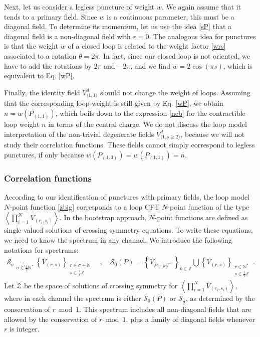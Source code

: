 \documentclass[12pt, a4paper]{article}
\begin{document}
Next, let us consider a legless puncture of weight $w$. We again assume that it tends to a primary field. Since $w$ is a continuous parameter, this must be a diagonal field. To determine its momentum, let us use the idea \eqref{sP} that a diagonal field is a non-diagonal field with $r=0$. The analogous idea for punctures is that the weight $w$ of a closed loop is related to the weight factor \eqref{wrs} associated to a rotation $\theta = 2\pi$. In fact, since our closed loop is not oriented, we have to add the rotations by $2\pi$ and $-2\pi$, and we find $w=2\cos(\pi s)$, which is equivalent to Eq. \eqref{wP}. 

Finally, the identity field $V^d_{\langle 1,1\rangle}$ should not change the weight of loops. Assuming that 
the corresponding loop weight is still given by Eq. \eqref{wP}, we obtain 
$n=w(P_{(1,1)})$, which boils down to the expression \eqref{ncb} for the contractible loop weight $n$ in terms of the central charge. We do not discuss the loop model interpretation of the non-trivial degenerate fields $V^d_{\langle 1,s\geq 2\rangle}$, because we will not study their correlation functions. These fields cannot simply correspond to legless punctures, if only because $w(P_{(1,3)})=w(P_{(1,1)})=n$. 

\subsubsection{Correlation functions}\label{sec:cf}

According to our identification of punctures with primary fields, the loop model $N$-point function \eqref{zbig} corresponds to a loop CFT $N$-point function of the type $\left<\prod_{i=1}^N V_{(r_i,s_i)}\right>$. In the bootstrap approach, $N$-point functions are defined as single-valued solutions of crossing symmetry equations. To write these equations, we need to know the spectrum in any channel. We introduce the following notations for spectrums:
\begin{align}
 \mathcal{S}_{\sigma} \underset{\sigma\in \frac12\mathbb{N}^*}{=} \left\{V_{(r,s)}\right\}_{\substack{r\in \sigma+\mathbb{N} \\ s\in\frac{1}{r}\mathbb{Z}}} \quad , \quad \mathcal{S}_0(P) = \left\{V_{P+k\beta^{-1}}\right\}_{k\in\mathbb{Z}} \bigcup \left\{V_{(r,s)}\right\}_{\substack{r\in\mathbb{N}^* \\ s\in\frac{1}{r}\mathbb{Z}}}\ .
 \label{sxs}
\end{align}
Let $\mathcal{Z}$ be the space of solutions of crossing symmetry for $\left<\prod_{i=1}^N V_{(r_i,s_i)}\right>$, where in each channel the spectrum is either $\mathcal{S}_0(P)$ or $\mathcal{S}_\frac12$, as determined by the conservation of $r\bmod 1$. This spectrum includes all non-diagonal fields that are allowed by the conservation of $r\bmod 1$, plus a family of diagonal fields whenever $r$ is integer. 
\end{document}
